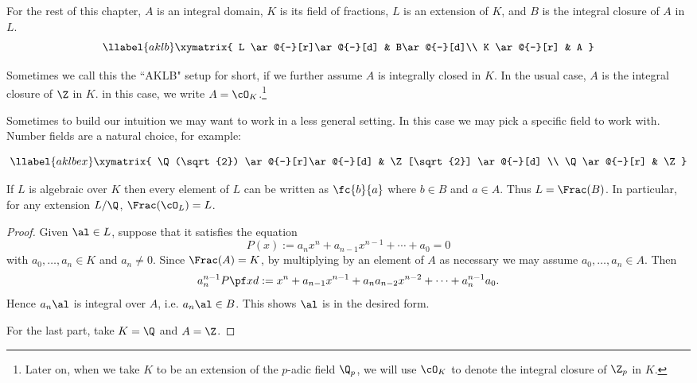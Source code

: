 \noindent For the rest of this chapter, $A$ is an integral domain, $K$ is its field of fractions, $L$ is an extension of $K$, and $B$ is the integral closure of $A$ in $L$. %
\begin{equation}\llabel{aklb}
\xymatrix{
  L \ar@{-}[r]\ar@{-}[d] & B\ar@{-}[d]\\
  K \ar@{-}[r]           & A
}
\end{equation}

\noindent Sometimes we call this the ``AKLB" setup for short, if we further assume $A$ is integrally closed in $K$. In the usual case, $A$ is the integral closure of $\Z$ in $K$. in this case, we write $A=\cO_K$.\footnote{Later on, when we take $K$ to be an extension of the $p$-adic field $\Q_p$, we will use $\cO_K$ to denote the integral closure of $\Z_p$ in $K$.}

\begin{ex}
Sometimes to build our intuition we may want to work in a less general setting. In this case we may pick a specific field to work with. Number fields are a natural choice, for example:

\begin{equation}\llabel{aklbex}
\xymatrix{
  \Q(\sqrt{2}) \ar@{-}[r]\ar@{-}[d] & \Z[\sqrt{2}] \ar@{-}[d] \\
  \Q           \ar@{-}[r]           & \Z
}
\end{equation}
\end{ex}

\begin{pr}
If $L$ is algebraic over $K$ then every element of $L$ can be written as $\fc{b}{a}$ where $b\in B$ and $a\in A$. Thus  $L=\Frac(B)$.
In particular, for any extension $L/\Q$, $\Frac(\cO_L)=L$.
\end{pr}
\begin{proof}
Given $\al\in L$, suppose that it satisfies the equation
\[
P(x):=a_nx^n+a_{n-1}x^{n-1}+\cdots +a_0=0
\]
with $a_0,\ldots, a_n\in K$ and $a_n\ne 0$. Since $\Frac(A)=K$, by multiplying by an element of $A$ as necessary we may assume $a_0,\ldots, a_n\in A$. Then
\[
a_n^{n-1}P\pf xd:=x^n+a_{n-1}x^{n-1}+a_na_{n-2}x^{n-2}+\cdots +a_n^{n-1}a_0.
\]
Hence $a_n\al$ is integral over $A$, i.e. $a_n\al \in B$. This shows $\al$ is in the desired form.

For the last part, take $K=\Q$ and $A=\Z$.
\end{proof}

